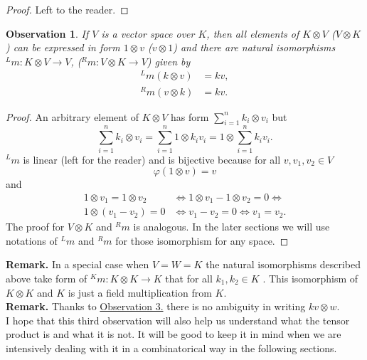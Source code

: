 \documentclass[a4paper, 12pt]{article}
\newtheorem{observation}{Observation}
\begin{document}
\begin{proof}
Left to the reader.
\end{proof}
\begin{observation}\label{observation:5}
If $V$ is a vector space over $K$, then all elements of $K \otimes V$ ($V \otimes K$) can be expressed in
form $1 \otimes v$ ($v \otimes 1$) and there are natural isomorphisms ${^Lm} : K \otimes V \to V$,
(${^Rm} : V \otimes K \to V$) given by
\begin{align*}
{^Lm}(k \otimes v) &= kv, \\
{^Rm}(v \otimes k) &= kv.
\end{align*}
\end{observation}
\begin{proof}
An arbitrary element of $K \otimes V$ has form $\displaystyle\sum^n_{i=1}k_i \otimes v_i$ but
\begin{equation*}
\sum^n_{i=1}k_i \otimes v_i = \sum^n_{i=1} 1 \otimes k_iv_i = 1 \otimes \sum^n_{i=1}k_iv_i.
\end{equation*}
${^Lm}$ is linear (left for the reader) and is bijective because for all $v, v_1, v_2 \in V$
\begin{equation*}
\varphi(1 \otimes v) = v
\end{equation*}
and
\begin{align*}
1 \otimes v_1 = 1 \otimes v_2 &\iff 1 \otimes v_1 - 1 \otimes v_2 = 0 \iff \\
1 \otimes (v_1 - v_2) = 0 &\iff v_1 -v_2 = 0 \iff v_1 = v_2.
\end{align*}
The proof for $V \otimes K$ and ${^Rm}$ is analogous. In the later sections we will use notations of
${^Lm}$ and ${^Rm}$ for those isomorphism for any space.
\end{proof}
\textbf{Remark. } In a special case when $V = W = K$ the natural isomorphisms described above
take form of ${^Km} : K \otimes K \to K$ that for all $k_1, k_2\in K$
. This isomorphism of $K \otimes K$ and $K$ is just a field
multiplication from $K$. \\[8pt]
\noindent \textbf{Remark. } Thanks to \hyperref[observation:3]{Observation 3.} there is no ambiguity in
writing
$kv \otimes w$. \\
I hope that this third observation will also help us understand what the tensor product is and what it is
 not.
It will be good to keep it in mind when we are intensively dealing with it in a combinatorical way in
the following sections.
\end{document}
